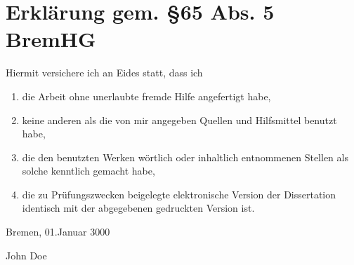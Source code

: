 \chapter{Erkl\"arung gem. \S65 Abs. 5 BremHG}

Hiermit versichere ich an Eides statt, dass ich
%
\begin{enumerate}
    \item die Arbeit ohne unerlaubte fremde Hilfe angefertigt habe,
    \item keine anderen als die von mir angegeben Quellen und Hilfsmittel benutzt habe,
    \item die den benutzten Werken w\"ortlich oder inhaltlich entnommenen Stellen als solche kenntlich gemacht habe,
    \item die zu Prüfungszwecken beigelegte elektronische Version der Dissertation identisch mit der abgegebenen gedruckten Version ist.
\end{enumerate}

\bigskip

Bremen, 01.\@ Januar 3000 \bigskip

John Doe

\bigskip
\bigskip

\noindent

